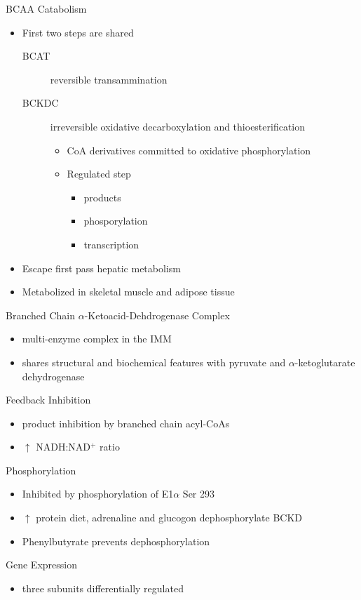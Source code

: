 \documentclass[presentation, smaller]{beamer}
\begin{document}
\begin{frame}[label={sec:orgheadline3}]{BCAA Catabolism}
\begin{itemize}
\item First two steps are shared
\begin{description}
\item[{BCAT}] reversible transammination
\item[{BCKDC}] irreversible oxidative decarboxylation and thioesterification
\begin{itemize}
\item CoA derivatives committed to oxidative phosphorylation
\item Regulated step
\begin{itemize}
\item products
\item phosporylation
\item transcription
\end{itemize}
\end{itemize}
\end{description}
\item Escape first pass hepatic metabolism
\item Metabolized in skeletal muscle and adipose tissue
\end{itemize}
\end{frame}

\begin{frame}[label={sec:orgheadline4}]{Branched Chain \(\alpha\)-Ketoacid-Dehdrogenase Complex}
\begin{itemize}
\item multi-enzyme complex in the IMM
\item shares structural and biochemical features with pyruvate and
\(\alpha\)-ketoglutarate dehydrogenase
\end{itemize}
\begin{block}{Feedback Inhibition}
\begin{itemize}
\item product inhibition by branched chain acyl-CoAs
\item \(\uparrow\) NADH:NAD\(^{\text{+}}\) ratio
\end{itemize}
\end{block}
\begin{block}{Phosphorylation}
\begin{itemize}
\item Inhibited by phosphorylation of E1\(\alpha\) Ser 293
\item \(\uparrow\) protein diet, adrenaline and glucogon dephosphorylate BCKD
\item Phenylbutyrate prevents dephosphorylation
\end{itemize}
\end{block}
\begin{block}{Gene Expression}
\begin{itemize}
\item three subunits differentially regulated
\end{itemize}
\end{block}
\end{frame}
\end{document}
